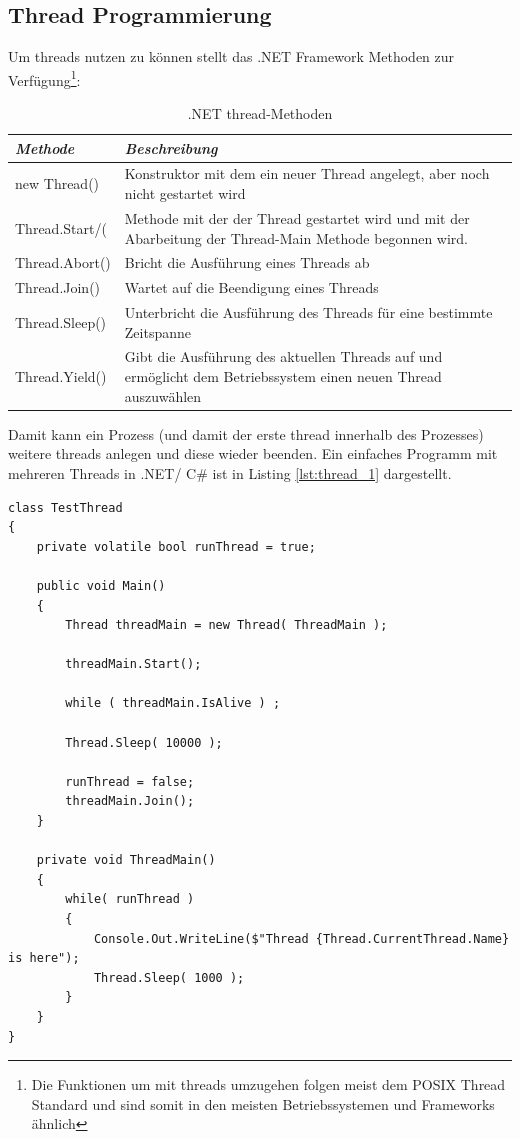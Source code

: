 \subsection{Thread Programmierung}
Um threads nutzen zu können stellt das .NET Framework  Methoden zur Verfügung\cite{ms_threading}\footnote{Die Funktionen um mit threads umzugehen folgen meist dem POSIX Thread Standard und sind somit in den meisten Betriebssystemen und Frameworks ähnlich\cite{butenhof1997} }:
\begin{table}[]
	\centering
	\label{Ttab:thread-methoden}
	\begin{tabular}{| l | p{10cm} |}
		\hline
		\textit{\textbf{Methode}} & \textit{\textbf{Beschreibung}}  \\
		\hline
		new Thread()                                         &    Konstruktor mit dem ein neuer Thread angelegt, aber noch nicht gestartet wird\\
		\hline
		Thread.Start/(                                        &    Methode mit der der Thread gestartet wird und mit der Abarbeitung der Thread-Main Methode begonnen wird.\\
		\hline
		Thread.Abort()                                        &   Bricht die Ausführung eines Threads ab\\
		\hline
		Thread.Join()										 & Wartet auf die Beendigung eines Threads\\
		\hline
		Thread.Sleep()										& Unterbricht die Ausführung des Threads für eine bestimmte Zeitspanne\\
		\hline
		Thread.Yield()										& Gibt die Ausführung des aktuellen Threads auf und ermöglicht dem Betriebssystem einen neuen Thread auszuwählen\cite{ms_threading_yield}\\
		\hline
	\end{tabular}
	\caption{.NET thread-Methoden}
\end{table}
Damit kann ein Prozess (und damit der erste thread innerhalb des Prozesses) weitere threads anlegen und diese wieder beenden. Ein einfaches Programm mit mehreren Threads in .NET/ C\# ist in Listing \ref{lst:thread_1} dargestellt.
\begin{lstlisting}[caption={Thread Hello World},label={lst:thread_1},captionpos=b]
class TestThread
{
	private volatile bool runThread = true;
	
	public void Main()
	{
		Thread threadMain = new Thread( ThreadMain );

		threadMain.Start();

		while ( threadMain.IsAlive ) ;

		Thread.Sleep( 10000 );

		runThread = false;
		threadMain.Join();
	}
	
	private void ThreadMain()
	{
		while( runThread )
		{
			Console.Out.WriteLine($"Thread {Thread.CurrentThread.Name} is here");
			Thread.Sleep( 1000 );
		}
	}
}
\end{lstlisting}
